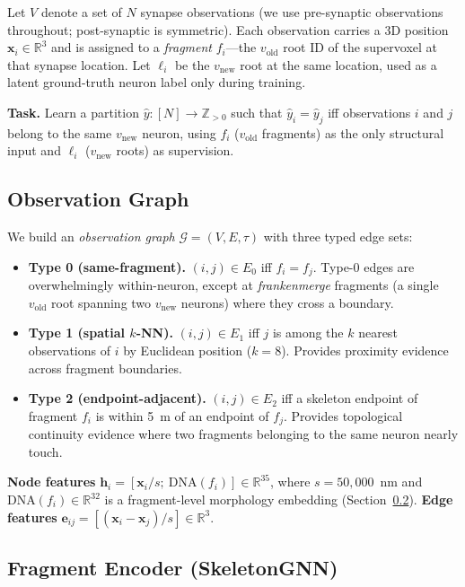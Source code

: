 \documentclass[10pt,letterpaper]{article}
\begin{document}
Let $V$ denote a set of $N$ synapse observations (we use pre-synaptic observations
throughout; post-synaptic is symmetric). Each observation carries a 3D position
$\mathbf{x}_i \in \mathbb{R}^3$ and is assigned to a \emph{fragment} $f_i$---the
$v_\text{old}$ root ID of the supervoxel at that synapse location. Let $\ell_i$ be the
$v_\text{new}$ root at the same location, used as a latent ground-truth neuron label
only during training.

\textbf{Task.} Learn a partition $\hat{y} : [N] \to \mathbb{Z}_{>0}$ such that
$\hat{y}_i = \hat{y}_j$ iff observations $i$ and $j$ belong to the same $v_\text{new}$
neuron, using $f_i$ ($v_\text{old}$ fragments) as the only structural input and $\ell_i$
($v_\text{new}$ roots) as supervision.

\subsection{Observation Graph}

We build an \emph{observation graph} $\mathcal{G} = (V, E, \tau)$ with three typed edge sets:

\begin{itemize}
\item \textbf{Type 0 (same-fragment).} $(i,j) \in E_0$ iff $f_i = f_j$. Type-0 edges are
  overwhelmingly within-neuron, except at \emph{frankenmerge} fragments (a single
  $v_\text{old}$ root spanning two $v_\text{new}$ neurons) where they cross a boundary.
\item \textbf{Type 1 (spatial $k$-NN).} $(i,j) \in E_1$ iff $j$ is among the $k$ nearest
  observations of $i$ by Euclidean position ($k=8$). Provides proximity evidence across
  fragment boundaries.
\item \textbf{Type 2 (endpoint-adjacent).} $(i,j) \in E_2$ iff a skeleton endpoint of
  fragment $f_i$ is within 5~\textmu{}m of an endpoint of $f_j$. Provides topological
  continuity evidence where two fragments belonging to the same neuron nearly touch.
\end{itemize}

\textbf{Node features} $\mathbf{h}_i = [\mathbf{x}_i / s;\ \mathrm{DNA}(f_i)] \in \mathbb{R}^{35}$,
where $s = 50{,}000$~nm and $\mathrm{DNA}(f_i) \in \mathbb{R}^{32}$ is a fragment-level
morphology embedding (Section~\ref{sec:encoder}).
\textbf{Edge features} $\mathbf{e}_{ij} = [(\mathbf{x}_i - \mathbf{x}_j)/s] \in \mathbb{R}^3$.

\subsection{Fragment Encoder (SkeletonGNN)}
\label{sec:encoder}
\end{document}
